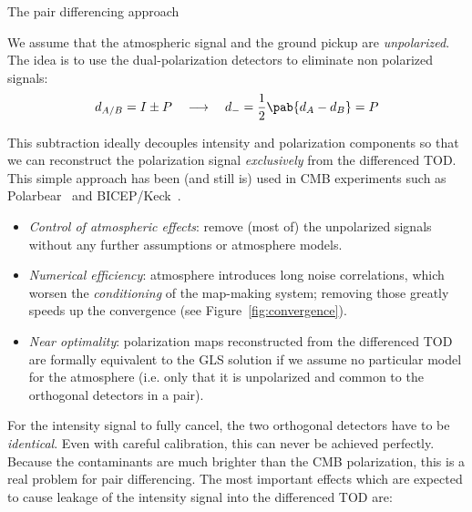 \documentclass[final]{beamer}
\newlength{\colwidth}
\begin{document}
\begin{frame}[t]
\begin{columns}[t]
\begin{column}{\colwidth}
\begin{alertblock}{The pair differencing approach}

        We assume that the atmospheric signal and the ground pickup are \emph{unpolarized}.
        The idea is to use the dual-polarization detectors
        to eliminate non polarized signals:
        \[
          d_{A/B} = I \pm P
          \quad\longrightarrow\quad
          d_- = \frac12 \pab{d_A - d_B} = P
        \]

        This subtraction ideally decouples intensity and polarization components so that we can reconstruct the polarization signal \emph{exclusively} from the differenced TOD.
        This simple approach has been (and still is) used in CMB experiments such as Polarbear~\cite{Poletti:2016xhi} and BICEP/Keck~\cite{BICEP2:2014dgt}. %


        \begin{itemize}
          \item \emph{Control of atmospheric effects}: remove (most of) the unpolarized signals without any further assumptions or atmosphere models.
          \item \emph{Numerical efficiency}: atmosphere introduces long noise correlations, which worsen the \emph{conditioning} of the map-making system; removing those greatly speeds up the convergence (see Figure~\ref{fig:convergence}).
          \item \emph{Near optimality}: polarization maps reconstructed from the differenced TOD are formally equivalent to the GLS solution if we assume no particular model for the atmosphere (i.e. only that it is unpolarized and common to the orthogonal detectors in a pair).
        \end{itemize}


        For the intensity signal to fully cancel, the two orthogonal detectors have to be \emph{identical}.
        Even with careful calibration, this can never be achieved perfectly.
        Because the contaminants are much brighter than the CMB polarization, this is a real problem for pair differencing.
        The most important effects which are expected to cause leakage of the intensity signal into the differenced TOD are:


\end{alertblock}
\end{column}
\end{columns}
\end{frame}
\end{document}
